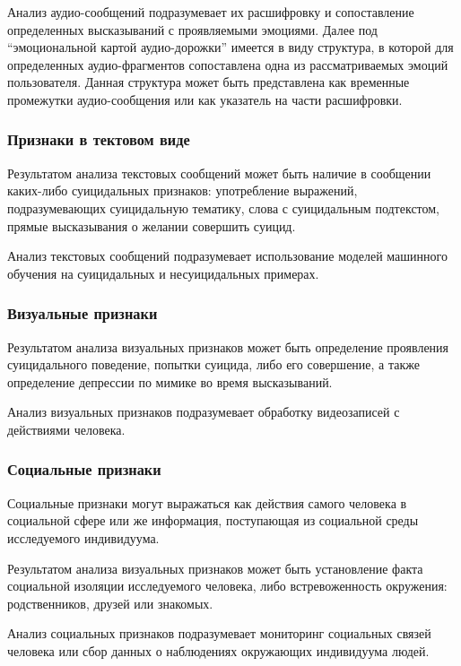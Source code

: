 Анализ аудио-сообщений подразумевает их расшифровку и сопоставление определенных высказываний с проявляемыми эмоциями. Далее под ``эмоциональной картой аудио-дорожки'' имеется в виду структура, в которой для определенных аудио-фрагментов сопоставлена одна из рассматриваемых эмоций пользователя. Данная структура может быть представлена как временные промежутки аудио-сообщения или как указатель на части расшифровки. 

\subsubsection{Признаки в тектовом виде}

Результатом анализа текстовых сообщений может быть наличие в сообщении каких-либо суицидальных признаков: употребление выражений, подразумевающих суицидальную тематику, слова с суицидальным подтекстом, прямые высказывания о желании совершить суицид.

Анализ текстовых сообщений подразумевает использование моделей машинного обучения на суицидальных и несуицидальных примерах.

\subsubsection{Визуальные признаки}

Результатом анализа визуальных признаков может быть определение проявления суицидального поведение, попытки суицида, либо его совершение, а также определение депрессии по мимике во время высказываний.

Анализ визуальных признаков подразумевает обработку видеозаписей с действиями человека.

\subsubsection{Социальные признаки}

Социальные признаки могут выражаться как действия самого человека в социальной сфере или же информация, поступающая из социальной среды исследуемого индивидуума.

Результатом анализа визуальных признаков может быть установление факта социальной изоляции исследуемого человека, либо встревоженность окружения: родственников, друзей или знакомых.

Анализ социальных признаков подразумевает мониторинг социальных связей человека или сбор данных о наблюдениях окружающих индивидуума людей.

